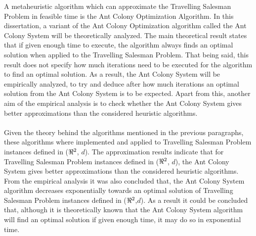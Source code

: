 \documentclass[12pt]{article}
\numberwithin{equation}{subsection}
\numberwithin{table}{subsection}
\numberwithin{algorithm}{subsection}
\begin{document}
A metaheuristic algorithm which can approximate the Travelling Salesman Problem in feasible time is the Ant Colony Optimization Algorithm. In this dissertation, a variant of the Ant Colony Optimization algorithm called the Ant Colony System will be theoretically analyzed. The main theoretical result states that if given enough time to execute, the algorithm always finds an optimal solution when applied to the Travelling Salesman Problem. That being said, this result does not specify how much iterations need to be executed for the algorithm to find an optimal solution. As a result, the Ant Colony System will be empirically analyzed, to try and deduce after how much iterations an optimal solution from the Ant Colony System is to be expected. Apart from this, another aim of the empirical analysis is to check whether the Ant Colony System gives better approximations than the considered heuristic algorithms.\\\\
Given the theory behind the algorithms mentioned in the previous paragraphs, these algorithms where implemented and applied to Travelling Salesman Problem instances defined in ($\real^2$, $d$). The approximation results indicate that for Travelling Salesman Problem instances defined in ($\real^2$, $d$), the Ant Colony System gives better approximations than the considered heuristic algorithms. From the empirical analysis it was also concluded that, the Ant Colony System algorithm decreases exponentially towards an optimal solution of Travelling Salesman Problem instances defined in ($\real^2$,$d$). As a result it could be concluded that, although it is theoretically known that the Ant Colony System algorithm will find an optimal solution if given enough time, it may do so in exponential time.
\newpage
\tableofcontents
\newpage
{}
{}
\end{document}
